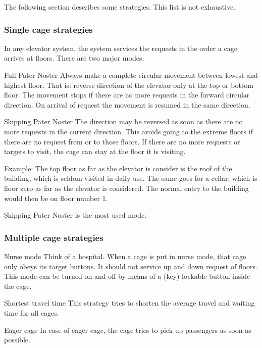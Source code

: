The following section describes some strategies. This list is not exhaustive.

\subsubsection{Single cage strategies}
In any elevator system, the system services the requests in the order
a cage arrives at floors. There are two major modes:

\begin{Description}

\item[Full Pater Noster] Always make a complete circular movement
  between lowest and highest floor. That is: reverse direction of the
  elevator only at the top or bottom floor. The movement stops if
  there are no more requests in the forward circular direction. On
  arrival of request the movement is resumed in the same direction.
\item[Skipping Pater Noster] The direction may be reversed as soon as
  there are no more requests in the current direction. This avoids
  going to the extreme floors if there are no request from or to those
  floors. If there are no more requests or targets to visit, the cage
  can stay at the floor it is visiting.

  Example: The top floor as far as the elevator is consider is
  the roof of the building, which is seldom visited in daily use. The
  same goes for a cellar, which is floor zero as far as the elevator
  is considered. The normal entry to the building would then be on
  floor number 1.
\end{Description}

Skipping Pater Noster is the most used mode.

\subsubsection{Multiple cage strategies}
\begin{Description}
\item[Nurse mode] Think of a hospital. When a cage is put in nurse
  mode, that cage only obeys its target buttons. It should not service
  up and down request of floors. This mode can be turned on and off by
  means of a (key) lockable button inside the cage.
\item[Shortest travel time] This strategy tries to shorten the average travel
  and waiting time for all cages.
\item[Eager cage] In case of eager cage, the cage tries to pick up
  passengers as soon as possible.
\end{Description}


